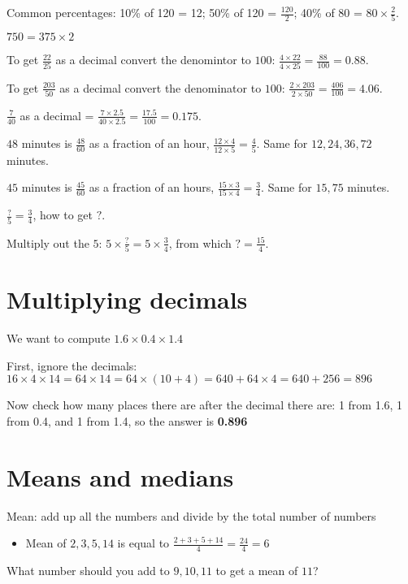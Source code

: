 \documentclass[fullpage,twocolumn]{article}
\begin{document}
Common percentages: 10\% of 120 = 12; 50\% of 120 = $\frac{120}{2}$;
40\% of 80 = $80 \times \frac{2}{5}$.

$750 =  375 \times 2$

To get $\frac{22}{25}$ as a decimal convert the
denomintor to $100$: $\frac{4\times 22}{4\times 25} = \frac{88}{100} = 0.88$.

To get $\frac{203}{50}$ as a decimal convert the
denominator to $100$: $\frac{2 \times 203}{2 \times 50} = \frac{406}{100} = 4.06$.

$\frac{7}{40}$ as a decimal = $\frac{7 \times 2.5 }{40 \times 2.5} = \frac{17.5}{100} = 0.175$.

$48$ minutes is $\frac{48}{60}$ as a fraction of an hour, $\frac{12\times 4 }{12 \times 5} = \frac{4}{5}$. Same for $12, 24, 36, 72$ minutes.

$45$ minutes is $\frac{45}{60}$ as a fraction of an hours, $\frac{15 \times 3}{15 \times 4} = \frac{3}{4}$. Same for $15, 75$ minutes.


$\frac{?}{5} = \frac{3}{4}$, how to get $?$.

Multiply out the $5$: $5 \times \frac{?}{5} =  5 \times \frac{3}{4}$,
from which $? = \frac{15}{4}$.


\section{Multiplying decimals}

We want to compute $1.6 \times 0.4 \times 1.4$

First, ignore the decimals:
$16 \times 4 \times 14 = 64 \times 14 = 64 \times (10 + 4) = 640 + 64 \times 4 = 640 + 256 = 896$

Now check how many places there are after the decimal there are: 1 from 1.6, 1 from 0.4, and 1 from 1.4,
so the answer is {\bf 0.896}

\section{Means and medians}

Mean: add up all the numbers and divide by the total number of numbers
\begin{itemize}
\item Mean of $2,3,5,14$ is equal to $\frac{2+3+5+14}{4} = \frac{24}{4} = 6$
\end{itemize}

What number should you add to $9,10,11$ to get a mean of $11$?
\end{document}
